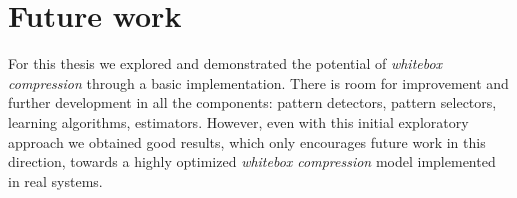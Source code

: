 \iffalse
\fi

\section{Future work}

For this thesis we explored and demonstrated the potential of \textit{whitebox compression} through a basic implementation. There is room for improvement and further development in all the components: pattern detectors, pattern selectors, learning algorithms, estimators. However, even with this initial exploratory approach we obtained good results, which only encourages future work in this direction, towards a highly optimized \textit{whitebox compression} model implemented in real systems.

